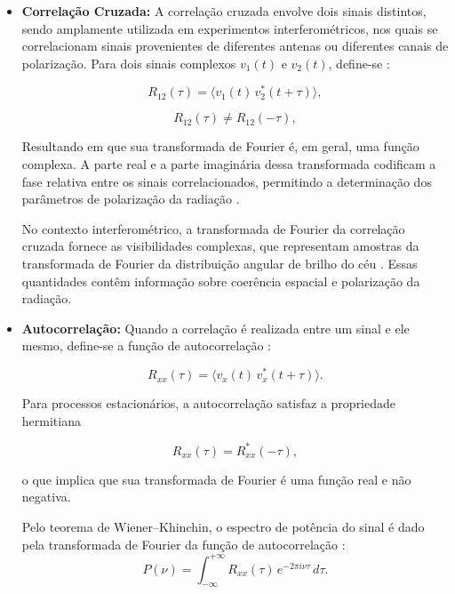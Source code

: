\begin{itemize}

    \item \textbf{Correlação Cruzada:}  
A correlação cruzada envolve dois sinais distintos, sendo amplamente utilizada em experimentos interferométricos, nos quais se correlacionam sinais provenientes de diferentes antenas ou diferentes canais de polarização. Para dois sinais complexos $v_1(t)$ e $v_2(t)$, define-se \cite{Heiles2001}:

\begin{equation}
R_{12}(\tau) = \langle v_1(t)\, v_2^*(t+\tau) \rangle,
\end{equation}



\begin{equation}
R_{12}(\tau) \neq R_{12}(-\tau),
\end{equation}

Resultando em que sua transformada de Fourier é, em geral, uma função complexa. A parte real e a parte imaginária dessa transformada codificam a fase relativa entre os sinais correlacionados, permitindo a determinação dos parâmetros de polarização da radiação \cite{Heiles2001, wilson2013tools}.

No contexto interferométrico, a transformada de Fourier da correlação cruzada fornece as visibilidades complexas, que representam amostras da transformada de Fourier da distribuição angular de brilho do céu \cite{thompson2017interferometry}. Essas quantidades contêm informação sobre coerência espacial e polarização da radiação.

\item \textbf{Autocorrelação:}  
Quando a correlação é realizada entre um sinal e ele mesmo, define-se a função de autocorrelação \cite{Lopez2023, Hagen2002}:

\begin{equation}
R_{xx}(\tau) = \langle v_x(t)\, v_x^*(t+\tau) \rangle.
\label{autocorrelacao}
\end{equation}

Para processos estacionários, a autocorrelação satisfaz a propriedade hermitiana

\begin{equation}
R_{xx}(\tau) = R_{xx}^*(-\tau),
\end{equation}

o que implica que sua transformada de Fourier é uma função real e não negativa.

Pelo teorema de Wiener--Khinchin, o espectro de potência do sinal é dado pela transformada de Fourier da função de autocorrelação \cite{Hagen2002}:
\begin{equation}
P(\nu) = \int_{-\infty}^{+\infty} R_{xx}(\tau)\, e^{-2\pi i \nu \tau}\, d\tau.
\end{equation}


\end{itemize}
